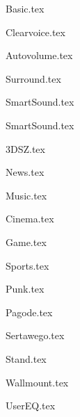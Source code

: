 {Basic.tex}

{Clearvoice.tex}

{Autovolume.tex}

{Surround.tex}

{SmartSound.tex}

{SmartSound.tex}

{3DSZ.tex}

{News.tex}

{Music.tex}

{Cinema.tex}

{Game.tex}

{Sports.tex}

{Punk.tex}

{Pagode.tex}

{Sertawego.tex}

{Stand.tex}

{Wallmount.tex}

{UserEQ.tex}